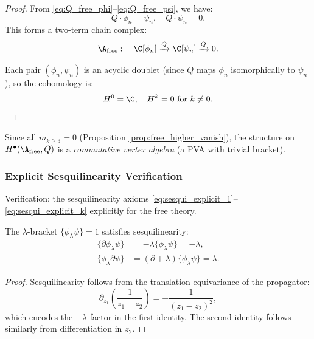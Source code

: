 \begin{proof}
From \eqref{eq:Q_free_phi}--\eqref{eq:Q_free_psi}, we have:
\begin{equation}
Q \cdot \phi_n = \psi_n, \quad Q \cdot \psi_n = 0.
\end{equation}
This forms a two-term chain complex:
\begin{equation}
\A_{\text{free}} : \quad \C[\phi_n] \xrightarrow{Q} \C[\psi_n] \xrightarrow{Q} 0.
\end{equation}

Each pair $(\phi_n, \psi_n)$ is an acyclic doublet (since $Q$ maps $\phi_n$ isomorphically to $\psi_n$), so the cohomology is:
\begin{equation}
H^0 = \C, \quad H^{k} = 0 \text{ for } k \neq 0.
\end{equation}
\end{proof}
Since all $m_{k \geq 3} = 0$ (Proposition \ref{prop:free_higher_vanish}), the structure on $H^\bullet(\A_{\text{free}}, Q)$ is a \emph{commutative vertex algebra} (a PVA with trivial bracket).

\subsubsection{Explicit Sesquilinearity Verification}

Verification: the sesquilinearity axioms \eqref{eq:sesqui_explicit_1}--\eqref{eq:sesqui_explicit_k} explicitly for the free theory.
\begin{lemma}
The $\lambda$-bracket $\{\phi_\lambda \psi\} = 1$ satisfies sesquilinearity:
\begin{align}
\{\partial \phi_\lambda \psi\} &= -\lambda \{\phi_\lambda \psi\} = -\lambda, \\
\{\phi_\lambda \partial \psi\} &= (\partial + \lambda) \{\phi_\lambda \psi\} = \lambda.
\end{align}
\end{lemma}

\begin{proof}
Sesquilinearity follows from the translation equivariance of the propagator:
\begin{equation}
\partial_{z_1} \left( \frac{1}{z_1 - z_2} \right) = -\frac{1}{(z_1 - z_2)^2},
\end{equation}
which encodes the $-\lambda$ factor in the first identity. The second identity follows similarly from differentiation in $z_2$.
\end{proof}

